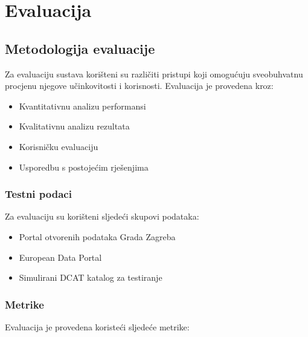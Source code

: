 \chapter{Evaluacija}
\label{ch:evaluation}


\section{Metodologija evaluacije}
\label{sec:methodology}

Za evaluaciju sustava korišteni su različiti pristupi koji omogućuju sveobuhvatnu 
procjenu njegove učinkovitosti i korisnosti. Evaluacija je provedena kroz:

\begin{itemize}
    \item Kvantitativnu analizu performansi
    \item Kvalitativnu analizu rezultata
    \item Korisničku evaluaciju
    \item Usporedbu s postojećim rješenjima
\end{itemize}

\subsection{Testni podaci}
Za evaluaciju su korišteni sljedeći skupovi podataka:
\begin{itemize}
    \item Portal otvorenih podataka Grada Zagreba
    \item European Data Portal
    \item Simulirani DCAT katalog za testiranje
\end{itemize}

\subsection{Metrike}
Evaluacija je provedena koristeći sljedeće metrike:

